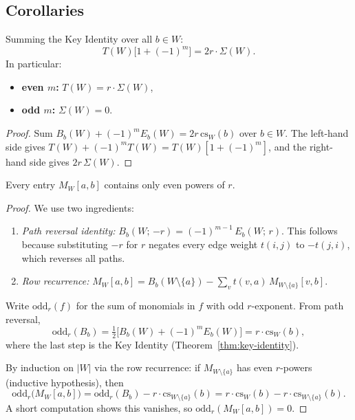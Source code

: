 \subsection{Corollaries}

\begin{corollary}\label{cor:sigma-identity}
Summing the Key Identity over all $b \in W$:
\[
  T(W)\bigl[1 + (-1)^m\bigr] = 2r \cdot \Sigma(W).
\]
In particular:
\begin{itemize}[leftmargin=2em]
  \item \textbf{even $m$:} $T(W) = r \cdot \Sigma(W)$,
  \item \textbf{odd $m$:} $\Sigma(W) = 0$.
\end{itemize}
\end{corollary}

\begin{proof}
Sum $B_b(W) + (-1)^m E_b(W) = 2r\, \mathrm{cs}_W(b)$ over $b \in W$.
The left-hand side gives $T(W) + (-1)^m T(W) = T(W)[1 + (-1)^m]$,
and the right-hand side gives $2r\, \Sigma(W)$.
\end{proof}

\begin{corollary}\label{cor:even-r-powers}
Every entry $M_W[a,b]$ contains only even powers of $r$.
\end{corollary}

\begin{proof}
We use two ingredients:
\begin{enumerate}[leftmargin=2em]
  \item \emph{Path reversal identity:}
    $B_b(W;\, {-r}) = (-1)^{m-1}\, E_b(W;\, r)$.
    This follows because substituting $-r$ for $r$ negates every edge weight
    $t(i,j)$ to $-t(j,i)$, which reverses all paths.

  \item \emph{Row recurrence:}
    $M_W[a,b] = B_b(W \setminus \{a\})
      - \sum_v t(v,a)\, M_{W \setminus \{a\}}[v,b]$.
\end{enumerate}

Write $\mathrm{odd}_r(f)$ for the sum of monomials in $f$ with odd
$r$-exponent.  From path reversal,
\[
  \mathrm{odd}_r(B_b)
  = \tfrac{1}{2}\bigl[B_b(W) + (-1)^m E_b(W)\bigr]
  = r \cdot \mathrm{cs}_W(b),
\]
where the last step is the Key Identity (Theorem~\ref{thm:key-identity}).

By induction on $|W|$ via the row recurrence:
if $M_{W \setminus \{a\}}$ has even $r$-powers (inductive hypothesis),
then
\[
  \mathrm{odd}_r\!\bigl(M_W[a,b]\bigr)
  = \mathrm{odd}_r(B_b) - r \cdot \mathrm{cs}_{W \setminus \{a\}}(b)
  = r \cdot \mathrm{cs}_W(b) - r \cdot \mathrm{cs}_{W \setminus \{a\}}(b).
\]
A short computation shows this vanishes, so
$\mathrm{odd}_r(M_W[a,b]) = 0$.
\end{proof}

